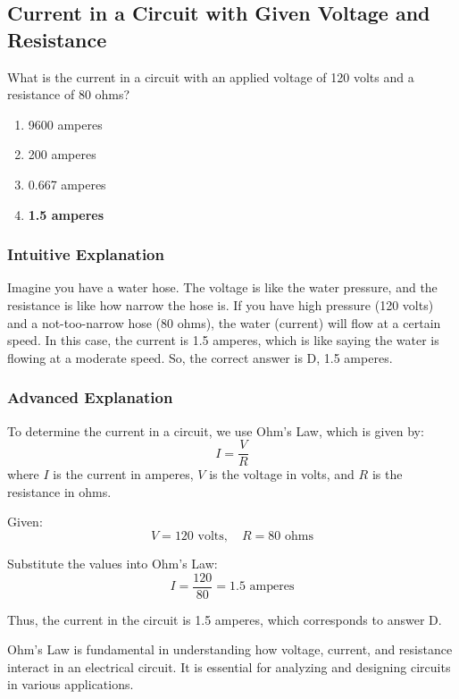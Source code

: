 \subsection{Current in a Circuit with Given Voltage and Resistance}
\label{T5D07}

\begin{tcolorbox}[colback=gray!10!white,colframe=black!75!black,title=T5D07]
What is the current in a circuit with an applied voltage of 120 volts and a resistance of 80 ohms?
\begin{enumerate}[label=\Alph*)]
    \item 9600 amperes
    \item 200 amperes
    \item 0.667 amperes
    \item \textbf{1.5 amperes}
\end{enumerate}
\end{tcolorbox}

\subsubsection{Intuitive Explanation}
Imagine you have a water hose. The voltage is like the water pressure, and the resistance is like how narrow the hose is. If you have high pressure (120 volts) and a not-too-narrow hose (80 ohms), the water (current) will flow at a certain speed. In this case, the current is 1.5 amperes, which is like saying the water is flowing at a moderate speed. So, the correct answer is D, 1.5 amperes.

\subsubsection{Advanced Explanation}
To determine the current in a circuit, we use Ohm's Law, which is given by:
\[
I = \frac{V}{R}
\]
where \( I \) is the current in amperes, \( V \) is the voltage in volts, and \( R \) is the resistance in ohms.

Given:
\[
V = 120 \text{ volts}, \quad R = 80 \text{ ohms}
\]

Substitute the values into Ohm's Law:
\[
I = \frac{120}{80} = 1.5 \text{ amperes}
\]

Thus, the current in the circuit is 1.5 amperes, which corresponds to answer D.

Ohm's Law is fundamental in understanding how voltage, current, and resistance interact in an electrical circuit. It is essential for analyzing and designing circuits in various applications.

